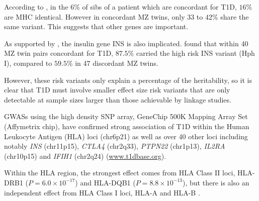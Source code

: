 According to \citet{Alper200689}, in the $6\%$ of sibs of a patient which are concordant for T1D, $16\%$ are MHC identical.
However in concordant MZ twins, only $33$ to $42\%$ share the same variant.  This suggests that other genes are important.

As supported by \citet{Metcalfe:2001}, the insulin gene INS is also implicated.
\citep{Metcalfe:2001} found that within 40 MZ twin pairs concordant for T1D, $87.5\%$ carried the high risk INS variant (Hph I), compared to $59.5\%$ in 47 discordant MZ twins.



However, these risk variants only explain a percentage of the heritability, so it is clear that T1D must involve smaller effect size risk variants that are only detectable at sample sizes larger than those achievable by linkage studies.



\Glspl{GWAS} using the high density SNP array, GeneChip 500K Mapping Array Set (Affymetrix chip), have confirmed strong association of T1D within the Human Leukocyte Antigen (HLA) loci (chr6p21) as well as over 40 other loci including notably \emph{INS} (chr11p15), \emph{CTLA4} (chr2q33), \emph{PTPN22} (chr1p13), \emph{IL2RA} (chr10p15) and \emph{IFIH1} (chr2q24) \citep{Burton:2007hta,Barrett:2009jq} (\url{www.t1dbase.org}).


Within the HLA region, the strongest effect comes from HLA Class II loci, HLA-DRB1 ($P= 6.0 \times 10^{-17}$) and HLA-DQB1 ($P= 8.8 \times 10^{-13}$),
but there is also an independent effect from HLA Class I loci, HLA-A and HLA-B \citep{Howson:2009bl}.




